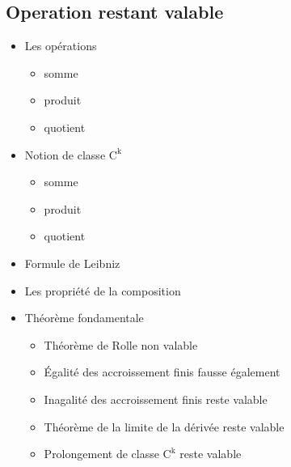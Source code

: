 \documentclass{article}
\newcommand{\co}[1]{\mathrm{C^{#1}}}
\theoremstyle{definition}
\theoremstyle{remark}
\theoremstyle{plain}
\begin{document}
\subsection{Operation restant valable}
\begin{itemize}
    \item Les opérations
    \begin{itemize}
        \item somme
        \item produit
        \item quotient
    \end{itemize}
    \item Notion de classe $\co{k}$
    \begin{itemize}
        \item somme
        \item produit
        \item quotient
    \end{itemize}
    \item Formule de Leibniz
    \item Les propriété de la composition
    \item Théorème fondamentale
    \begin{itemize}
        \item Théorème de Rolle non valable
        \item \'Egalité des accroissement finis fausse également
        \item Inagalité des accroissement finis reste valable
        \item Théorème de la limite de la dérivée reste valable
        \item Prolongement de classe $\co{k}$ reste valable
    \end{itemize}
\end{itemize}
\end{document}
